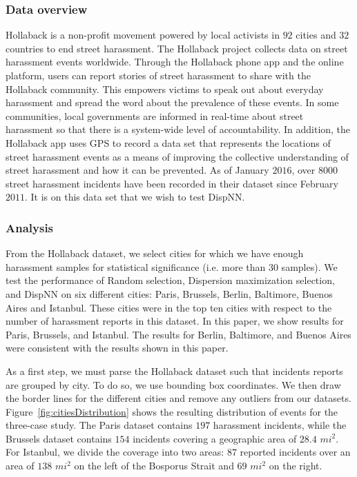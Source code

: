 \documentclass{acm_proc_article-sp}
\begin{document}
\subsubsection{Data overview}
Hollaback is a non-profit movement powered by local activists in $92$ cities and $32$ countries to end street harassment. The Hollaback project collects data on street harassment events worldwide. Through the Hollaback phone app and the online platform, users can report stories of street harassment to share with the Hollaback community. This empowers victims to speak out about everyday harassment and spread the word about the prevalence of these events. In some communities, local governments are informed in real-time about street harassment so that there is a system-wide level of accountability. In addition, the Hollaback app uses GPS to record a data set that represents the locations of street harassment events as a means of improving the collective understanding of street harassment and how it can be prevented.  As of January $2016$, over $8000$ street harassment incidents have been recorded in their dataset since February $2011$.  It is on this data set that we wish to test DispNN.\par
\subsubsection{Analysis}
From the Hollaback dataset, we select cities for which we have enough harassment samples for statistical significance (i.e. more than 30 samples). We test the performance of Random selection, Dispersion maximization selection, and DispNN on six different cities: Paris, Brussels, Berlin, Baltimore, Buenos Aires and Istanbul. These cities were in the top ten cities with respect to the number of harassment reports in this dataset. In this paper, we show results for Paris, Brussels, and Istanbul. The results for Berlin, Baltimore, and Buenos Aires were consistent with the results shown in this paper. \par

As a first step, we must parse the Hollaback dataset such that incidents reports are grouped by city. To do so, we use bounding box coordinates. We then draw the border lines for the different cities and remove any outliers from our datasets. Figure~\ref{fig:citiesDistribution} shows the resulting distribution of events for the three-case study. The Paris dataset contains $197$ harassment incidents, while the Brussels dataset contains $154$ incidents covering a geographic area of $28.4$ $mi^2$. For Istanbul, we divide the coverage into two areas: $87$ reported incidents over an area of $138$ $mi^2$ on the left of the Bosporus Strait and $69$ $mi^2$ on the right. \par
\end{document}
